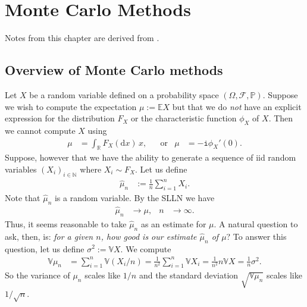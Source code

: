 \documentclass[12pt]{book}
\numberwithin{equation}{chapter}
\theoremstyle{plain}
\numberwithin{theorem}{section}
\theoremstyle{definition}
\numberwithin{exercise}{chapter}
\newcommand{\<}{\langle}
\renewcommand{\>}{\rangle}
\renewcommand{\(}{\left(}
\renewcommand{\)}{\right)}
\renewcommand{\[}{\left[}
\renewcommand{\]}{\right]}
\newcommand\Eb{\mathds{E}}
\newcommand\Pb{\mathds{P}}
\newcommand\Rb{\mathds{R}}
\newcommand\Nb{\mathds{N}}
\newcommand\Vb{\mathds{V}}
\newcommand\Dc{\mathscr{D}}
\newcommand\Fc{\mathscr{F}}
\newcommand\Nc{\mathscr{N}}
\newcommand\Om{\Omega}
\newcommand\sig{\sigma}
\newcommand\muh{\widehat{\mu}}
\newcommand\ii{\mathtt{i}}
\newcommand\dd{\mathrm{d}}
\begin{document}
%
%

\chapter{Monte Carlo Methods}
\label{ch:monte-carlo}
Notes from this chapter are derived from \cite{glasserman2013monte}.

\section{Overview of Monte Carlo methods}
Let $X$ be a random variable defined on a probability space $(\Om,\Fc,\Pb)$.
Suppose we wish to compute the expectation $\mu := \Eb X$ but that we do \emph{not} have an explicit expression for the distribution $F_X$ or the characteristic function $\phi_X$ of $X$.  Then we cannot compute $X$ using
\begin{align}
\mu
	&=	\int_\Rb F_X(\dd x) \, x, &
	&\text{or}&
\mu
	&=	-\ii \phi_X'(0) .
\end{align}
Suppose, however that we have the ability to generate a sequence of iid random variables $(X_i)_{i \in \Nb}$ where $X_i \sim F_X$.  Let us define
\begin{align}
\muh_n
	&:=	\frac{1}{n} \sum_{i=1}^n X_i .
\end{align}
Note that $\muh_n$ is a random variable.  By the SLLN we have
\begin{align}
\muh_n
	&\to \mu , &
n
	&\to \infty .
\end{align}
Thus, it seems reasonable to take $\muh_n$ as an estimate for $\mu$.
A natural question to ask, then, is: \emph{for a given $n$, how good is our estimate $\muh_n$ of $\mu$}?  To answer this question, let us define $\sig^2 := \Vb X$.  We compute
\begin{align}
\Vb \mu_n
	&=	\sum_{i=1}^n \Vb( X_i/n)
	=		\frac{1}{n^2} \sum_{i=1}^n \Vb X_i
	=		\frac{1}{n^2} n \Vb X 
	=		\frac{1}{n} \sig^2 .
\end{align}
So the variance of $\mu_n$ scales like $1/n$ and the standard deviation $\sqrt{\Vb \mu_n}$ scales like $1/\sqrt{n}$.
\end{document}
